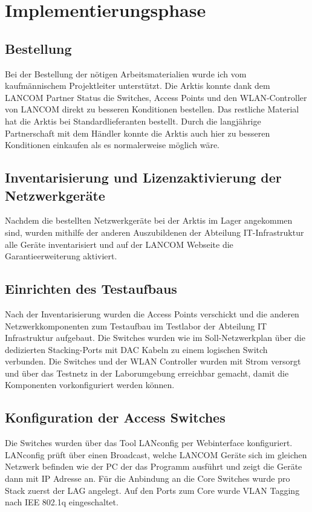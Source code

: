 \section{Implementierungsphase} 
\label{sec:Implementierungsphase}
\subsection{Bestellung}
\label{sec:Bestellung}
Bei der Bestellung der nötigen Arbeitsmaterialien wurde ich vom kaufmännischem Projektleiter unterstützt. Die \ac{Arktis} konnte dank dem LANCOM Partner Status die Switches, Access Points und den WLAN-Controller von LANCOM direkt zu besseren Konditionen bestellen. Das restliche Material hat die \ac{Arktis} bei Standardlieferanten bestellt. Durch die langjährige Partnerschaft mit dem Händler konnte die Arktis auch hier zu besseren Konditionen einkaufen als es normalerweise möglich wäre.
\subsection{Inventarisierung und Lizenzaktivierung der Netzwerkgeräte}
\label{Inventarisierung und Lizenzaktivierung der Netzwerkgeräte}
Nachdem die bestellten Netzwerkgeräte bei der \ac{Arktis} im Lager angekommen sind, wurden mithilfe der anderen Auszubildenen der Abteilung IT-Infrastruktur alle Geräte inventarisiert und auf der LANCOM Webseite die Garantieerweiterung aktiviert. 

\subsection{Einrichten des Testaufbaus}
\label{sec:Einrichten des Testaufbaus}
Nach der Inventarisierung wurden die Access Points verschickt und die anderen Netzwerkkomponenten zum Testaufbau im Testlabor der Abteilung IT Infrastruktur aufgebaut. Die Switches wurden wie im Soll-Netzwerkplan über die dedizierten Stacking-Ports mit \ac{DAC} Kabeln zu einem logischen Switch verbunden. Die Switches und der WLAN Controller wurden mit Strom versorgt und über das Testnetz in der Laborumgebung erreichbar gemacht, damit die Komponenten vorkonfiguriert werden können.


\subsection{Konfiguration der Access Switches}
\label{sec:Konfiguration der Layer 2 Switche}
Die Switches wurden über das Tool LANconfig per Webinterface konfiguriert. LANconfig prüft über einen Broadcast, welche LANCOM Geräte sich im gleichen Netzwerk befinden wie der PC der das Programm ausführt und zeigt die Geräte dann mit IP Adresse an. Für die Anbindung an die Core Switches wurde pro Stack zuerst der \ac{LAG} angelegt. Auf den Ports zum Core wurde VLAN Tagging nach IEE 802.1q eingeschaltet.  

